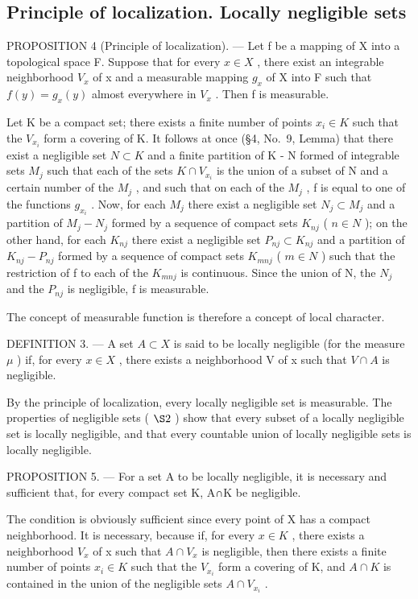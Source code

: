 \subsection{Principle of localization. Locally negligible sets}

PROPOSITION 4 (Principle of localization). --- Let f be a mapping of X into a topological space F. Suppose that for every \(x \in X\) , there exist an integrable neighborhood \(V_{x}\) of x and a measurable mapping \(g_{x}\) of X into F such that \(f(y) = g_{x}(y)\) almost everywhere in \(V_{x}\) . Then f is measurable.

Let K be a compact set; there exists a finite number of points \(x_{i} \in K\) such that the \(V_{x_{i}}\) form a covering of K. It follows at once (§4, No.~9, Lemma) that there exist a negligible set \(N \subset K\) and a finite partition of K - N formed of integrable sets \(M_{j}\) such that each of the sets \(K \cap V_{x_{i}}\) is the union of a subset of N and a certain number of the \(M_{j}\) , and such that on each of the \(M_{j}\) , f is equal to one of the functions \(g_{x_{i}}\) . Now, for each \(M_{j}\) there exist a negligible set \(N_{j} \subset M_{j}\) and a partition of \(M_{j} - N_{j}\) formed by a sequence of compact sets \(K_{nj}\) ( \(n \in N\) ); on the other hand, for each \(K_{nj}\) there exist a negligible set \(P_{nj} \subset K_{nj}\) and a partition of \(K_{nj} - P_{nj}\) formed by a sequence of compact sets \(K_{mnj}\) ( \(m \in N\) ) such that the restriction of f to each of the \(K_{mnj}\) is continuous. Since the union of N, the \(N_{j}\) and the \(P_{nj}\) is negligible, f is measurable.

The concept of measurable function is therefore a concept of local character.

DEFINITION 3. --- A set \(A \subset X\) is said to be locally negligible (for the measure \(\mu\) ) if, for every \(x \in X\) , there exists a neighborhood V of x such that \(V \cap A\) is negligible.

By the principle of localization, every locally negligible set is measurable. The properties of negligible sets ( \(\S2\) ) show that every subset of a locally negligible set is locally negligible, and that every countable union of locally negligible sets is locally negligible.

PROPOSITION 5. --- For a set A to be locally negligible, it is necessary and sufficient that, for every compact set K, A∩K be negligible.

The condition is obviously sufficient since every point of X has a compact neighborhood. It is necessary, because if, for every \(x \in K\) , there exists a neighborhood \(V_{x}\) of x such that \(A \cap V_{x}\) is negligible, then there exists a finite number of points \(x_{i} \in K\) such that the \(V_{x_{i}}\) form a covering of K, and \(A \cap K\) is contained in the union of the negligible sets \(A \cap V_{x_{i}}\) .


